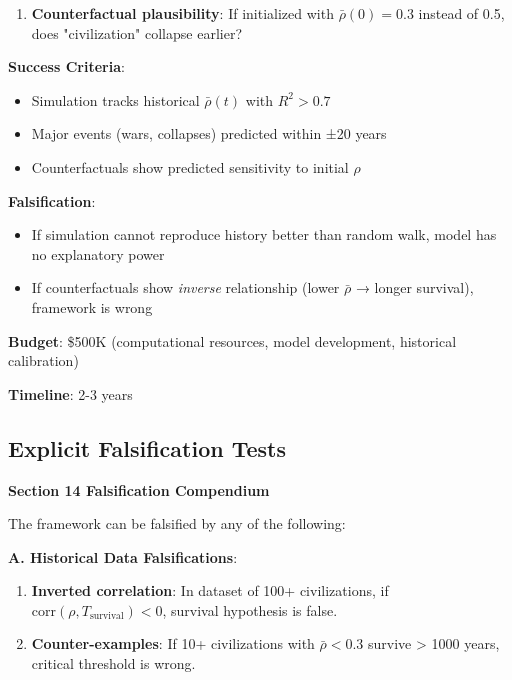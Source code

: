 \documentclass[11pt,a4paper]{article}
\theoremstyle{definition}
\theoremstyle{remark}
\begin{document}
\begin{enumerate}
\begin{protocol}
\begin{enumerate}
    \item \textbf{Counterfactual plausibility}: If initialized with \(\bar{\rho}(0) = 0.3\) instead of 0.5, does "civilization" collapse earlier?
\end{enumerate}

\textbf{Success Criteria}:
\begin{itemize}
    \item Simulation tracks historical \(\bar{\rho}(t)\) with \(R^2 > 0.7\)
    \item Major events (wars, collapses) predicted within ±20 years
    \item Counterfactuals show predicted sensitivity to initial \(\rho\)
\end{itemize}

\textbf{Falsification}:
\begin{itemize}
    \item If simulation cannot reproduce history better than random walk, model has no explanatory power
    \item If counterfactuals show \textit{inverse} relationship (lower \(\bar{\rho}\) → longer survival), framework is wrong
\end{itemize}

\textbf{Budget}: \$500K (computational resources, model development, historical calibration)

\textbf{Timeline}: 2-3 years
\end{protocol}

\subsection{Explicit Falsification Tests}

\begin{mdframed}[backgroundcolor=red!10,linewidth=2pt,linecolor=red!70!black]
\textbf{Section 14 Falsification Compendium}

The framework can be falsified by any of the following:

\textbf{A. Historical Data Falsifications}:
\begin{enumerate}
    \item \textbf{Inverted correlation}: In dataset of 100+ civilizations, if \(\text{corr}(\rho, T_{\text{survival}}) < 0\), survival hypothesis is false.
    
    \item \textbf{Counter-examples}: If 10+ civilizations with \(\bar{\rho} < 0.3\) survive > 1000 years, critical threshold is wrong.
    

\end{enumerate}
\end{mdframed}
\end{enumerate}
\end{document}
